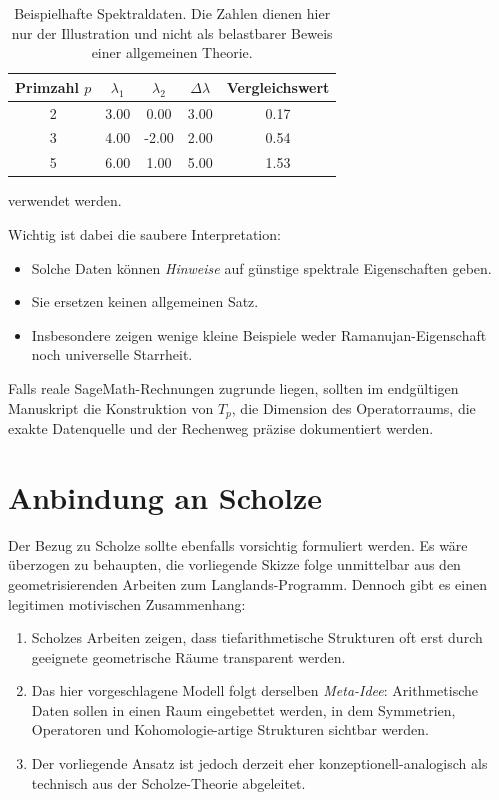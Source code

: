\documentclass[12pt,a4paper]{article}
\begin{document}
	\begin{table}[h]
		\centering
		\begin{tabular}{ccccc}
			\toprule
			Primzahl $p$ & $\lambda_1$ & $\lambda_2$ & $\Delta\lambda$ & Vergleichswert \\
			\midrule
			2 & 3.00 & 0.00  & 3.00 & 0.17 \\
			3 & 4.00 & -2.00 & 2.00 & 0.54 \\
			5 & 6.00 & 1.00  & 5.00 & 1.53 \\
			\bottomrule
		\end{tabular}
		\caption{Beispielhafte Spektraldaten. Die Zahlen dienen hier nur der Illustration und nicht als belastbarer Beweis einer allgemeinen Theorie.}
	\end{table}
	
	verwendet werden.
	
	Wichtig ist dabei die saubere Interpretation:
	\begin{itemize}
		\item Solche Daten können \emph{Hinweise} auf günstige spektrale Eigenschaften geben.
		\item Sie ersetzen keinen allgemeinen Satz.
		\item Insbesondere zeigen wenige kleine Beispiele weder Ramanujan-Eigenschaft noch universelle Starrheit.
	\end{itemize}
	
	Falls reale SageMath-Rechnungen zugrunde liegen, sollten im endgültigen Manuskript die Konstruktion von $T_p$, die Dimension des Operatorraums, die exakte Datenquelle und der Rechenweg präzise dokumentiert werden.
	
	\section{Anbindung an Scholze}
	
	Der Bezug zu Scholze sollte ebenfalls vorsichtig formuliert werden. Es wäre überzogen zu behaupten, die vorliegende Skizze folge unmittelbar aus den geometrisierenden Arbeiten zum Langlands-Programm. Dennoch gibt es einen legitimen motivischen Zusammenhang:
	
	\begin{enumerate}[label=\arabic*.]
		\item Scholzes Arbeiten zeigen, dass tiefarithmetische Strukturen oft erst durch geeignete geometrische Räume transparent werden.
		\item Das hier vorgeschlagene Modell folgt derselben \emph{Meta-Idee}: Arithmetische Daten sollen in einen Raum eingebettet werden, in dem Symmetrien, Operatoren und Kohomologie-artige Strukturen sichtbar werden.
		\item Der vorliegende Ansatz ist jedoch derzeit eher konzeptionell-analogisch als technisch aus der Scholze-Theorie abgeleitet.
	\end{enumerate}
	
\end{document}
